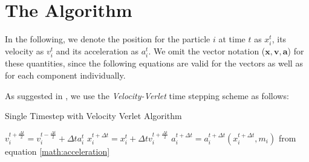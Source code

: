 \documentclass{sigchi}
\begin{document}
\section{The Algorithm}
%
In the following, we denote the position for the particle $i$ at time $t$ as $x_i^t$, its velocity as $v_i^t$ and its acceleration as $a_i^t$.
We omit the vector notation ($\boldsymbol{x},\boldsymbol{v},\boldsymbol{a}$) for these quantities, since the following equations are valid for the vectors as well as for each component individually.
\par\medskip
%
As suggested in \cite{generalizedwallboundary}, we use the \emph{Velocity-Verlet} time stepping scheme as follows:
%
\begin{algorithm}
	\caption{Single Timestep with Velocity Verlet Algorithm}
	$v_i^{t+\frac{\Delta t}{2}} = v_i^{t - \frac{\Delta t}{2}} + \Delta t a_i^t$ \;
	$x_i^{t+\Delta t} = x_i^t + \Delta t v_i^{t+\frac{\Delta t}{2}}$ \;	
	$a_i^{t + \Delta t} = a_i^{t + \Delta t} (x_i^{t + \Delta t}, m_i)$ from equation \ref{math:acceleration} \;
\end{algorithm}

\balance

\nocite{*}
\printbibliography

\clearpage
\begin{comment}
\clearpage

\section*{Appendix: Code}







\end{comment}
\end{document}
